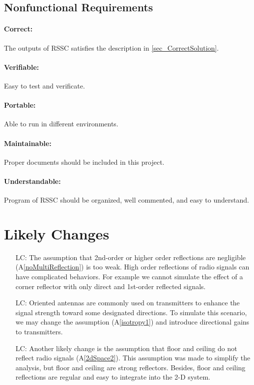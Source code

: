 \documentclass[12pt]{article}
\newcommand{\aref}[1]{A\ref{#1}}
\newcounter{lcnum} %
\begin{document}
\newpage
\subsection{Nonfunctional Requirements}

\paragraph{Correct:} The outputs of RSSC satisfies the description in \autoref{sec_CorrectSolution}.

\paragraph{Verifiable:} Easy to test and verificate.

\paragraph{Portable:} Able to run in different environments.

\paragraph{Maintainable:} Proper documents should be included in this project.

\paragraph{Understandable:} Program of RSSC should be organized, well commented, and easy
to understand.

\section{Likely Changes}    

\noindent \begin{itemize}

\item[LC\refstepcounter{lcnum}\thelcnum\label{HOR}:] The assumption that
2nd-order or higher order reflections are negligible (\aref{noMultiReflection}) 
is too weak. High order reflections of radio signals can have complicated behaviors. 
For example we cannot simulate the effect of a corner reflector with only direct 
and 1st-order reflected signals.

\item[LC\refstepcounter{lcnum}\thelcnum\label{IST}:]  Oriented antennas 
are commonly used on transmitters to enhance the signal strength toward some 
designated directions. To simulate this scenario, we may change the assumption
(\aref{isotropy1}) and introduce directional gains to transmitters.


\item[LC\refstepcounter{lcnum}\thelcnum\label{FCR}:]  Another likely 
change is the assumption that floor and ceiling do not reflect radio signals 
(\aref{2dSpace2}). This assumption was made to simplify the analysis, but floor
and ceiling are strong reflectors. Besides, floor and ceiling reflections
are regular and easy to integrate into the 2-D system.
\end{itemize}
\end{document}
